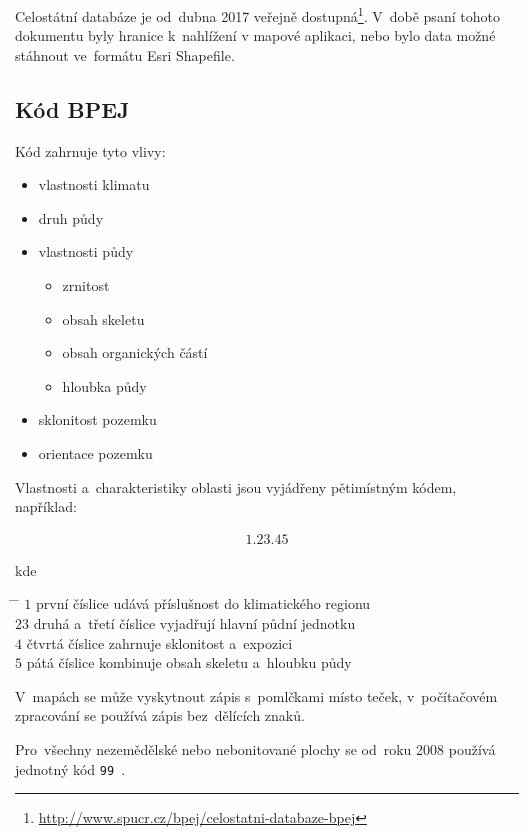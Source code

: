 Celostátní databáze  je od~dubna 2017 veřejně
dostupná\footnote{\url{http://www.spucr.cz/bpej/celostatni-databaze-bpej}}. V~době
psaní tohoto dokumentu byly hranice  k~nahlížení v mapové
aplikaci, nebo bylo data možné stáhnout ve~formátu Esri Shapefile.

\subsection{Kód BPEJ}
\label{kod_bpej}

Kód  zahrnuje tyto vlivy:
	\begin{itemize}[leftmargin=1.5cm, noitemsep]
		\item vlastnosti klimatu
		\item druh půdy
		\item vlastnosti půdy
			\begin{itemize}[leftmargin=1cm, noitemsep]
				\item zrnitost
				\item obsah skeletu
				\item obsah organických částí
				\item hloubka půdy
			\end{itemize}
		\item sklonitost pozemku
		\item orientace pozemku
	\end{itemize}

Vlastnosti a~charakteristiky oblasti  jsou vyjádřeny
pětimístným kódem, například:

\begin{align*} 1.23.45
\end{align*}

kde
\begin{tabbing} \hspace{2em} \= \hspace{5em} \= \kill \> $1$ \> první
číslice udává příslušnost do klimatického regionu \\ \> $23$ \> druhá
a~třetí číslice vyjadřují hlavní půdní jednotku \\ \> $4$ \> čtvrtá
číslice zahrnuje sklonitost a~expozici\\ \> $5$ \> pátá číslice
kombinuje obsah skeletu a~hloubku půdy
\end{tabbing}

V~mapách se může vyskytnout zápis s~pomlčkami místo teček,
v~počítačovém zpracování se používá zápis bez~dělících znaků.

Pro~všechny nezemědělské nebo nebonitované plochy se od~roku 2008
používá jednotný kód \texttt{99}~\citep{metodika_bpej}.

